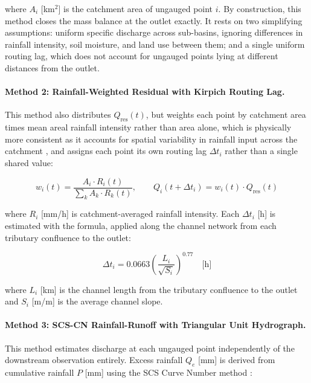 \documentclass[12pt,a4paper]{report}
\begin{document}
where $A_i$ [km$^2$] is the catchment area of ungauged point $i$. By construction, this
method closes the mass balance at the outlet exactly. It rests on two simplifying
assumptions: uniform specific discharge across sub-basins, ignoring differences in
rainfall intensity, soil moisture, and land use between them; and a single uniform
routing lag, which does not account for ungauged points lying at different distances
from the outlet.

\paragraph{Method 2: Rainfall-Weighted Residual with Kirpich Routing Lag.}
This method also distributes $Q_\text{res}(t)$, but weights each point by catchment
area times mean areal rainfall intensity rather than area alone, which is physically
more consistent as it accounts for spatial variability in rainfall input across the
catchment \citep{beven2012rainfall}, and assigns each point its own routing lag
$\Delta t_i$ rather than a single shared value:

\begin{equation}
    w_i(t) = \frac{A_i \cdot R_i(t)}{\sum_k A_k \cdot R_k(t)}, \qquad
    Q_i(t + \Delta t_i) = w_i(t) \cdot Q_\text{res}(t)
    \label{eq:method2}
\end{equation}

where $R_i$ [mm/h] is catchment-averaged rainfall intensity. Each $\Delta t_i$ [h] is
estimated with the \citet{kirpich1940time} formula, applied along the channel network
from each tributary confluence to the outlet:

\begin{equation}
    \Delta t_i = 0.0663 \left(\frac{L_i}{\sqrt{S_i}}\right)^{0.77} \quad \text{[h]}
    \label{eq:kirpich}
\end{equation}

where $L_i$ [km] is the channel length from the tributary confluence to the outlet and
$S_i$ [m/m] is the average channel slope.

\paragraph{Method 3: SCS-CN Rainfall-Runoff with Triangular Unit Hydrograph.}
This method estimates discharge at each ungauged
point independently of the downstream observation entirely. Excess rainfall $Q_e$
[mm] is derived from cumulative rainfall $P$ [mm] using the SCS Curve Number method
\citep{usdanrcs2004}:
\end{document}
